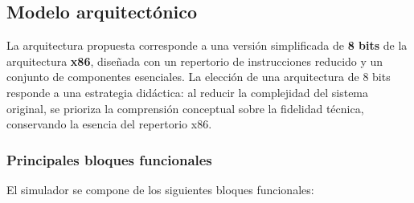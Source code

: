 \documentclass[12pt,oneside]{templates/unerthesis}
\begin{document}
\hypertarget{modelo-arquitectuxf3nico}{%
\subsection{Modelo arquitectónico}\label{modelo-arquitectuxf3nico}}

La arquitectura propuesta corresponde a una versión simplificada de \textbf{8 bits} de la arquitectura \textbf{x86}, diseñada con un repertorio de instrucciones reducido y un conjunto de componentes esenciales. La elección de una arquitectura de 8 bits responde a una estrategia didáctica: al reducir la complejidad del sistema original, se prioriza la comprensión conceptual sobre la fidelidad técnica, conservando la esencia del repertorio x86.

\hypertarget{principales-bloques-funcionales}{%
\subsubsection{Principales bloques funcionales}\label{principales-bloques-funcionales}}

El simulador se compone de los siguientes bloques funcionales:

\begin{table}[!h]
\centering
\caption{\label{tab:bloquesfuncionales}Bloques funcionales principales}
\centering
{}
\end{table}
\end{document}
